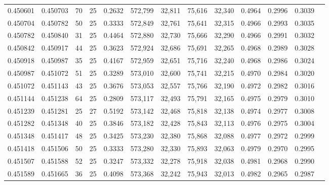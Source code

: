 \begin{tabular}{rrrrrrrrrrrrr}
0.450601 & 0.450703 &    70 &  25 &                                     0.2632 & 572,799 &  32,811 &  75,616 &  32,340 & 0.4964 & 0.2996 & 0.3039 \\
0.450704 & 0.450782 &    50 &  25 &                                     0.3333 & 572,849 &  32,761 &  75,641 &  32,315 & 0.4966 & 0.2993 & 0.3035 \\
0.450782 & 0.450840 &    31 &  25 &                                     0.4464 & 572,880 &  32,730 &  75,666 &  32,290 & 0.4966 & 0.2991 & 0.3032 \\
0.450842 & 0.450917 &    44 &  25 &                                     0.3623 & 572,924 &  32,686 &  75,691 &  32,265 & 0.4968 & 0.2989 & 0.3028 \\
0.450918 & 0.450987 &    35 &  25 &                                     0.4167 & 572,959 &  32,651 &  75,716 &  32,240 & 0.4968 & 0.2986 & 0.3024 \\
0.450987 & 0.451072 &    51 &  25 &                                     0.3289 & 573,010 &  32,600 &  75,741 &  32,215 & 0.4970 & 0.2984 & 0.3020 \\
0.451072 & 0.451143 &    43 &  25 &                                     0.3676 & 573,053 &  32,557 &  75,766 &  32,190 & 0.4972 & 0.2982 & 0.3016 \\
0.451144 & 0.451238 &    64 &  25 &                                     0.2809 & 573,117 &  32,493 &  75,791 &  32,165 & 0.4975 & 0.2979 & 0.3010 \\
0.451239 & 0.451281 &    25 &  27 &                                     0.5192 & 573,142 &  32,468 &  75,818 &  32,138 & 0.4974 & 0.2977 & 0.3008 \\
0.451282 & 0.451348 &    40 &  25 &                                     0.3846 & 573,182 &  32,428 &  75,843 &  32,113 & 0.4976 & 0.2975 & 0.3004 \\
0.451348 & 0.451417 &    48 &  25 &                                     0.3425 & 573,230 &  32,380 &  75,868 &  32,088 & 0.4977 & 0.2972 & 0.2999 \\
0.451418 & 0.451506 &    50 &  25 &                                     0.3333 & 573,280 &  32,330 &  75,893 &  32,063 & 0.4979 & 0.2970 & 0.2995 \\
0.451507 & 0.451588 &    52 &  25 &                                     0.3247 & 573,332 &  32,278 &  75,918 &  32,038 & 0.4981 & 0.2968 & 0.2990 \\
0.451589 & 0.451665 &    36 &  25 &                                     0.4098 & 573,368 &  32,242 &  75,943 &  32,013 & 0.4982 & 0.2965 & 0.2987 \\

\end{tabular}
